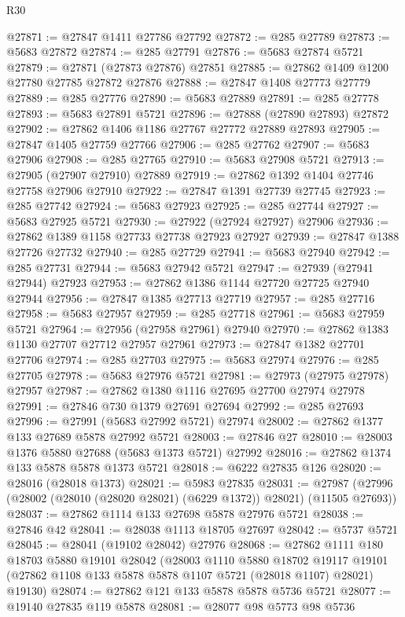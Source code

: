 \begin{lexlean}{R30}
\begin{coremodule}
@27871 := @27847 @1411 @27786 @27792
@27872 := @285 @27789
@27873 := @5683 @27872
@27874 := @285 @27791
@27876 := @5683 @27874 @5721
@27879 := @27871 (@27873 @27876) @27851
@27885 := @27862 @1409 @1200 @27780 @27785 @27872 @27876
@27888 := @27847 @1408 @27773 @27779
@27889 := @285 @27776
@27890 := @5683 @27889
@27891 := @285 @27778
@27893 := @5683 @27891 @5721
@27896 := @27888 (@27890 @27893) @27872
@27902 := @27862 @1406 @1186 @27767 @27772 @27889 @27893
@27905 := @27847 @1405 @27759 @27766
@27906 := @285 @27762
@27907 := @5683 @27906
@27908 := @285 @27765
@27910 := @5683 @27908 @5721
@27913 := @27905 (@27907 @27910) @27889
@27919 := @27862 @1392 @1404 @27746 @27758 @27906 @27910
@27922 := @27847 @1391 @27739 @27745
@27923 := @285 @27742
@27924 := @5683 @27923
@27925 := @285 @27744
@27927 := @5683 @27925 @5721
@27930 := @27922 (@27924 @27927) @27906
@27936 := @27862 @1389 @1158 @27733 @27738 @27923 @27927
@27939 := @27847 @1388 @27726 @27732
@27940 := @285 @27729
@27941 := @5683 @27940
@27942 := @285 @27731
@27944 := @5683 @27942 @5721
@27947 := @27939 (@27941 @27944) @27923
@27953 := @27862 @1386 @1144 @27720 @27725 @27940 @27944
@27956 := @27847 @1385 @27713 @27719
@27957 := @285 @27716
@27958 := @5683 @27957
@27959 := @285 @27718
@27961 := @5683 @27959 @5721
@27964 := @27956 (@27958 @27961) @27940
@27970 := @27862 @1383 @1130 @27707 @27712 @27957 @27961
@27973 := @27847 @1382 @27701 @27706
@27974 := @285 @27703
@27975 := @5683 @27974
@27976 := @285 @27705
@27978 := @5683 @27976 @5721
@27981 := @27973 (@27975 @27978) @27957
@27987 := @27862 @1380 @1116 @27695 @27700 @27974 @27978
@27991 := @27846 @730 @1379 @27691 @27694
@27992 := @285 @27693
@27996 := @27991 (@5683 @27992 @5721) @27974
@28002 := @27862 @1377 @133 @27689 @5878 @27992 @5721
@28003 := @27846 @27
@28010 := @28003 @1376 @5880 @27688 (@5683 @1373 @5721) @27992
@28016 := @27862 @1374 @133 @5878 @5878 @1373 @5721
@28018 := @6222 @27835 @126
@28020 := @28016 (@28018 @1373)
@28021 := @5983 @27835
@28031 := @27987 (@27996 (@28002 (@28010 (@28020 @28021) (@6229 @1372)) @28021) (@11505 @27693))
@28037 := @27862 @1114 @133 @27698 @5878 @27976 @5721
@28038 := @27846 @42
@28041 := @28038 @1113 @18705 @27697
@28042 := @5737 @5721
@28045 := @28041 (@19102 @28042) @27976
@28068 := @27862
    @1111
    @180
    @18703
    @5880
    @19101
    @28042
    (@28003
      @1110
      @5880
      @18702
      @19117
      @19101
      (@27862 @1108 @133 @5878 @5878 @1107 @5721 (@28018 @1107) @28021)
      @19130)
@28074 := @27862 @121 @133 @5878 @5878 @5736 @5721
@28077 := @19140 @27835 @119 @5878
@28081 := @28077 @98 @5773 @98 @5736

\end{coremodule}
\end{lexlean}
